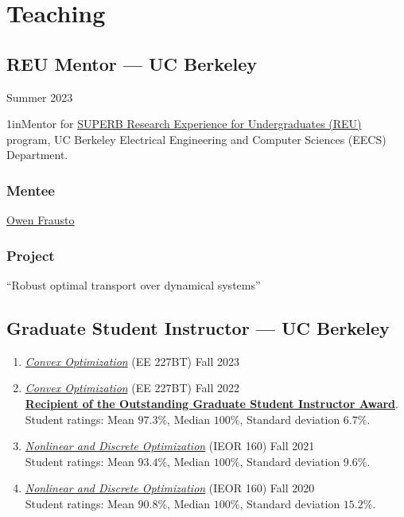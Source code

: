\documentclass[11pt]{article}
\newcommand{\sectionwidth}{1in}		%
\newcommand{\subsectionskip}{\baselineskip}	%
\newcommand{\cvdate}[1]{\hfill#1}			%
\begin{document}
	\section{Teaching}

	\subsection{REU Mentor --- UC Berkeley}
	\cvdate{Summer 2023}
	
	\begin{adjustwidth}{\sectionwidth}{}Mentor for \href{https://eecs.berkeley.edu/resources/undergrads/research/superb}{SUPERB Research Experience for Undergraduates (REU)} program, UC Berkeley Electrical Engineering and Computer Sciences (EECS) Department.\end{adjustwidth}

	\subsubsection{Mentee}
	\href{https://www.linkedin.com/in/owen-frausto-39786a217}{Owen Frausto}
	
	\subsubsection{Project}
	``Robust optimal transport over dynamical systems''
	
	\vspace*{\subsectionskip}
	
	\subsection{Graduate Student Instructor --- UC Berkeley}
	\begin{enumerate}[label={\arabic*.}]
		\item \href{https://classes.berkeley.edu/content/2023-fall-eleng-227bt-001-lec-001}{\textit{Convex Optimization}} (EE 227BT) \cvdate{Fall 2023}
		\item \href{https://classes.berkeley.edu/content/2022-fall-eleng-227bt-001-lec-001}{\textit{Convex Optimization}} (EE 227BT) \cvdate{Fall 2022} \\
		\textbf{\href{https://gsi.berkeley.edu/programs-services/award-programs/ogsi/ogsi-recipients-2022-2023/}{Recipient of the Outstanding Graduate Student Instructor Award}}. \\
		Student ratings: Mean $97.3\%$, Median $100\%$, Standard deviation $6.7\%$.
		\item \href{https://lavaei.ieor.berkeley.edu/Course_IEOR160_Fall_2021.html}{\textit{Nonlinear and Discrete Optimization}} (IEOR 160) \cvdate{Fall 2021} \\
		Student ratings: Mean $93.4\%$, Median $100\%$, Standard deviation $9.6\%$.
		\item \href{https://lavaei.ieor.berkeley.edu/Course_IEOR160_Fall_2020.html}{\textit{Nonlinear and Discrete Optimization}} (IEOR 160) \cvdate{Fall 2020} \\
		Student ratings: Mean $90.8\%$, Median $100\%$, Standard deviation $15.2\%$.
	\end{enumerate}
	
\end{document}
